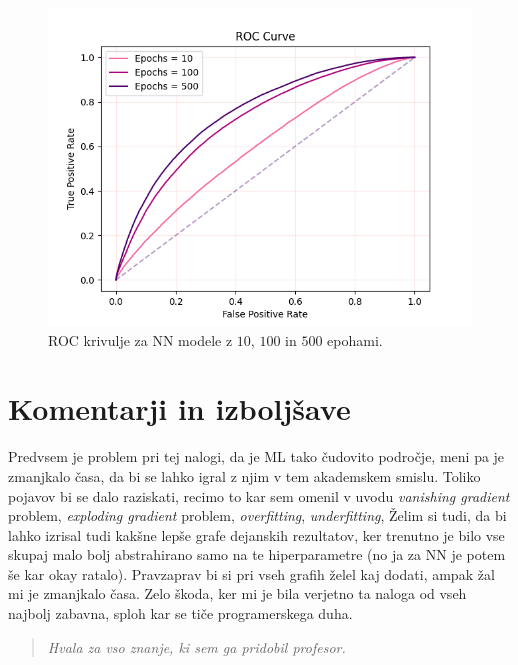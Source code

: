 \documentclass[a4paper]{article}
\begin{document}
\begin{figure}[H]
    \centering
    \includegraphics[width=1\textwidth]{../images/NN_ROC.png}
    \caption{ROC krivulje za NN modele z $10$, $100$ in $500$ epohami.}
    \label{fig:NN_ROC}
\end{figure}


\section{Komentarji in izboljšave}
Predvsem je problem pri tej nalogi, da je ML tako čudovito področje, meni pa je zmanjkalo časa, da bi se lahko
igral z njim v tem akademskem smislu. Toliko pojavov bi se dalo raziskati, recimo to kar sem omenil v uvodu 
\textit{vanishing gradient} problem, \textit{exploding gradient} problem, \textit{overfitting}, \textit{underfitting},
Želim si tudi, da bi lahko izrisal tudi kakšne lepše grafe dejanskih rezultatov, ker trenutno je bilo vse skupaj malo 
bolj abstrahirano samo na te hiperparametre (no ja za NN je potem še kar okay ratalo). Pravzaprav bi si pri vseh grafih 
želel kaj dodati, ampak žal mi je zmanjkalo časa. Zelo škoda, ker mi je bila verjetno ta naloga od vseh najbolj zabavna, 
sploh kar se tiče programerskega duha.  \\

\begin{quotation}
    \centering
    \textit{Hvala za vso znanje, ki sem ga pridobil profesor.}
\end{quotation}


\newpage


\end{document}
